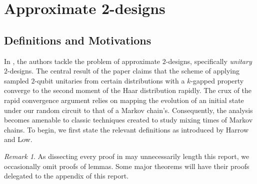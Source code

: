 \documentclass[12pt]{amsart}
\theoremstyle{definition}
\theoremstyle{remark}
\newtheorem{remark}[theorem]{Remark}
\numberwithin{equation}{section}
\theoremstyle{remark}
\begin{document}
\section{Approximate 2-designs}

\subsection{Definitions and Motivations}
In \cite{harrlow}, the authors tackle the problem of approximate $2$-designs, specifically \emph{unitary} $2$-designs. The central result of the paper claims that the scheme of applying sampled $2$-qubit unitaries from certain distributions with a $k$-gapped property converge to the second moment of the Haar distribution rapidly. The crux of the rapid convergence argument relies on mapping the evolution of an initial state under our random circuit to that of a Markov chain's.
Consequently, the analysis becomes amenable to classic techniques created to study mixing times of Markov chains. To begin, we first state the relevant definitions as introduced by Harrow and Low.
%
\begin{remark}
  As dissecting every proof in \cite{harrlow} may unnecessarily length this report, we occasionally omit proofs of lemmas. Some major theorems will have their proofs delegated to the appendix of this report.
\end{remark}
\end{document}
